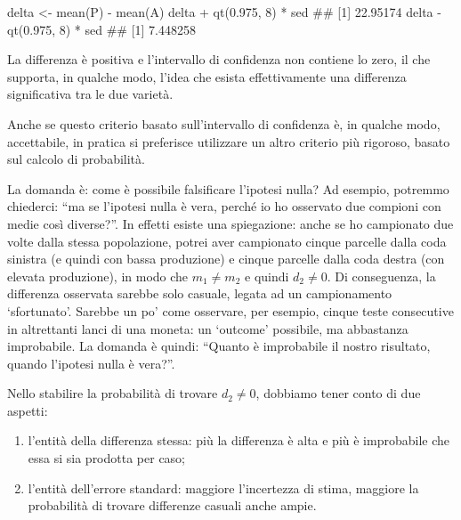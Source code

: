 \documentclass[a4paper,12pt,oneside]{book}
\providecommand{\tightlist}{%
  \setlength{\itemsep}{0pt}\setlength{\parskip}{0pt}}
\newenvironment{Shaded}{\begin{snugshade}}{\end{snugshade}}
\newcommand{\DecValTok}[1]{#1}
\newcommand{\FloatTok}[1]{#1}
\newcommand{\SpecialCharTok}[1]{#1}
\newcommand{\DocumentationTok}[1]{#1}
\newcommand{\OtherTok}[1]{#1}
\newcommand{\FunctionTok}[1]{#1}
\newcommand{\NormalTok}[1]{#1}
\begin{document}
\begin{Shaded}
\begin{Highlighting}[]
\NormalTok{delta }\OtherTok{\textless{}{-}} \FunctionTok{mean}\NormalTok{(P) }\SpecialCharTok{{-}} \FunctionTok{mean}\NormalTok{(A)}
\NormalTok{delta }\SpecialCharTok{+} \FunctionTok{qt}\NormalTok{(}\FloatTok{0.975}\NormalTok{, }\DecValTok{8}\NormalTok{) }\SpecialCharTok{*}\NormalTok{ sed}
\DocumentationTok{\#\# [1] 22.95174}
\NormalTok{delta }\SpecialCharTok{{-}} \FunctionTok{qt}\NormalTok{(}\FloatTok{0.975}\NormalTok{, }\DecValTok{8}\NormalTok{) }\SpecialCharTok{*}\NormalTok{ sed}
\DocumentationTok{\#\# [1] 7.448258}
\end{Highlighting}
\end{Shaded}

La differenza è positiva e l'intervallo di confidenza non contiene lo zero, il che supporta, in qualche modo, l'idea che esista effettivamente una differenza significativa tra le due varietà.

Anche se questo criterio basato sull'intervallo di confidenza è, in qualche modo, accettabile, in pratica si preferisce utilizzare un altro criterio più rigoroso, basato sul calcolo di probabilità.

La domanda è: come è possibile falsificare l'ipotesi nulla? Ad esempio, potremmo chiederci: ``ma se l'ipotesi nulla è vera, perché io ho osservato due compioni con medie così diverse?''. In effetti esiste una spiegazione: anche se ho campionato due volte dalla stessa popolazione, potrei aver campionato cinque parcelle dalla coda sinistra (e quindi con bassa produzione) e cinque parcelle dalla coda destra (con elevata produzione), in modo che \(m_1 \neq m_2\) e quindi \(d_2 \neq 0\). Di conseguenza, la differenza osservata sarebbe solo casuale, legata ad un campionamento `sfortunato'. Sarebbe un po' come osservare, per esempio, cinque teste consecutive in altrettanti lanci di una moneta: un `outcome' possibile, ma abbastanza improbabile. La domanda è quindi: ``Quanto è improbabile il nostro risultato, quando l'ipotesi nulla è vera?''.

Nello stabilire la probabilità di trovare \(d_2 \neq 0\), dobbiamo tener conto di due aspetti:

\begin{enumerate}
\def\labelenumi{\arabic{enumi}.}
\tightlist
\item
  l'entità della differenza stessa: più la differenza è alta e più è improbabile che essa si sia prodotta per caso;
\item
  l'entità dell'errore standard: maggiore l'incertezza di stima, maggiore la probabilità di trovare differenze casuali anche ampie.
\end{enumerate}
\end{document}
